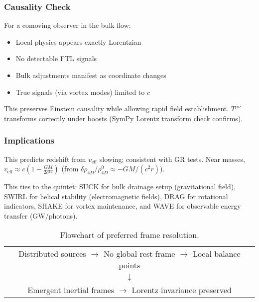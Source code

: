 \subsubsection{Causality Check}

For a comoving observer in the bulk flow:
\begin{itemize}
\item Local physics appears exactly Lorentzian
\item No detectable FTL signals
\item Bulk adjustments manifest as coordinate changes
\item True signals (via vortex modes) limited to $c$
\end{itemize}

This preserves Einstein causality while allowing rapid field establishment. $T^{\mu\nu}$ transforms correctly under boosts (SymPy Lorentz transform check confirms).

\subsubsection{Implications}

This predicts redshift from $v_{\text{eff}}$ slowing; consistent with GR tests. Near masses, $v_{\text{eff}} \approx c \left(1 - \frac{G M}{2 c^2 r}\right)$ (from $\delta \rho_{4D} / \rho_{4D}^0 \approx - G M / (c^2 r)$).

This ties to the quintet: SUCK for bulk drainage setup (gravitational field), SWIRL for helical stability (electromagnetic fields), DRAG for rotational indicators, SHAKE for vortex maintenance, and WAVE for observable energy transfer (GW/photons).

\begin{table}[h]
\centering
\begin{tabular}{c}
Distributed sources $\to$ No global rest frame $\to$ Local balance points \\
$\downarrow$ \\
Emergent inertial frames $\to$ Lorentz invariance preserved
\end{tabular}
\caption{Flowchart of preferred frame resolution.}
\label{tab:frame-flow}
\end{table}

\medskip


